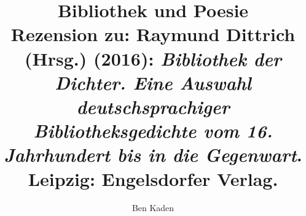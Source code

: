
\fancyhead[R]{\thepage} %

\title{\LARGE{Bibliothek und Poesie} \\ Rezension zu: Raymund Dittrich (Hrsg.) (2016): \emph{Bibliothek der Dichter. Eine Auswahl deutschsprachiger Bibliotheksgedichte vom 16. Jahrhundert bis in die Gegenwart}. Leipzig: Engelsdorfer Verlag.
} %
\author{Ben Kaden} %

\setcounter{page}{1}